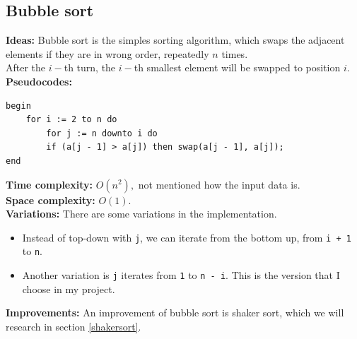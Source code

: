 \documentclass[12pt,a4paper]{article}
\begin{document}
\subsection{Bubble sort}
\textbf{Ideas:} Bubble sort is the simples sorting algorithm, which swaps the adjacent elements if they are in wrong order, repeatedly $n$ times.\\
After the $i-$th turn, the $i-$th smallest element will be swapped to position $i.$\\
\textbf{Pseudocodes:} \cite{gtvlt}
\lstset{language=Pascal} 
\begin{lstlisting}[caption = {Bubble sort}]
begin
	for i := 2 to n do
		for j := n downto i do
		if (a[j - 1] > a[j]) then swap(a[j - 1], a[j]);
end
\end{lstlisting}
\textbf{Time complexity:} $O \left( {n^2} \right),$ not mentioned how the input data is. \cite{gtvlt}\\
\textbf{Space complexity:} $O \left( {1} \right).$ \cite{comp}\\
\textbf{Variations:} There are some variations in the implementation.
\begin{itemize}
\item Instead of top-down with \lstinline{j}, we can iterate from the bottom up, from \lstinline{i + 1} to \lstinline{n}.
\item Another variation is \lstinline{j} iterates from \lstinline{1} to \lstinline{n - i}. This is the version that I choose in my project.
\end{itemize}
\textbf{Improvements:} An improvement of bubble sort is shaker sort, which we will research in section \ref{shakersort}.
\end{document}
